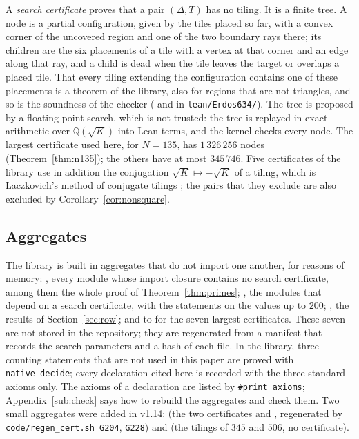 \documentclass[11pt,reqno]{amsart}
\theoremstyle{plain}
\theoremstyle{definition}
\newcommand{\Q}{\mathbb{Q}}
\begin{document}
A \emph{search certificate} proves that a pair $(\Delta,T)$ has no tiling. It is a finite tree. A node is a
partial configuration, given by the tiles placed so far, with a convex corner of the uncovered region and
one of the two boundary rays there; its children are the six placements of a tile with a vertex at that
corner and an edge along that ray, and a child is dead when the tile leaves the target or overlaps a placed
tile. That every tiling extending the configuration contains one of these placements is a theorem of the
library, also
for regions that are not triangles, and so is the soundness of the checker
( and  in \texttt{lean/Erdos634/}). The tree is proposed by a floating-point search,
which is not trusted: the tree is replayed in exact arithmetic over $\Q(\sqrt K)$ into Lean terms, and the
kernel checks every node. The largest certificate used here, for $N=135$, has $1\,326\,256$ nodes
(Theorem~\ref{thm:n135}); the others have at most $345\,746$. Five certificates of the library use in addition the conjugation
$\sqrt K\mapsto-\sqrt K$ of a tiling, which is Laczkovich's method of conjugate tilings \cite{Laczkovich2020};
the pairs that they exclude are also excluded by Corollary~\ref{cor:nonsquare}.

\subsection{Aggregates}
The library is built in aggregates that do not import one another, for reasons of memory:
, every module whose import closure contains no search certificate, among them the
whole proof of Theorem~\ref{thm:primes}; , the modules that depend on a search
certificate, with the statements on the values up to $200$; , the results of
Section~\ref{sec:row}; and  to  for the seven largest certificates. These seven
are not stored in the repository; they are regenerated from a manifest that records the search parameters
and a hash of each file. In the library, three counting statements that are not used in this paper are
proved with \texttt{native\_decide}; every declaration cited here is recorded with the three standard
axioms only. The axioms of a declaration are listed by \texttt{\#print axioms}; Appendix~\ref{sub:check}
says how to rebuild the aggregates and check them. Two small aggregates were added in v1.14:  (the two certificates  and , regenerated by \texttt{code/regen\_cert.sh G204}, \texttt{G228}) and  (the tilings of $345$ and $506$, no certificate).
\end{document}
